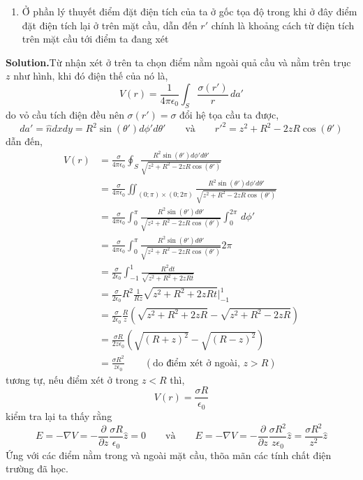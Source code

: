 \begin{enumerate}
\begin{enumerate}
\item Ở phần lý thuyết điểm đặt điện tích của ta ở gốc tọa độ trong khi ở đây điểm đặt điện tích lại ở trên mặt cầu, dẫn đến $r'$ chính là khoảng cách từ điện tích trên mặt cầu tới điểm ta đang xét
\end{enumerate} 
\textbf{Solution.}Từ nhận xét ở trên ta chọn điểm nằm ngoài quả cầu và nằm trên trục $z$ như hình, khi đó điện thế của nó là,
\[
V(r) = \frac{1}{4\pi\epsilon_{0}}\int_{S} \frac{\sigma(r')}{r} \, da'
\]
do vỏ cầu tích điện đều nên $\sigma(r') = \sigma$ đổi hệ tọa cầu ta được,
\[
da' = \hat{n}dxdy = R^2\sin(\theta')d\phi'd\theta' \qquad \text{và} \qquad r'^2 = z^2 + R^2 -2zR\cos(\theta')
\]
dẫn đến,
\begin{align*}
V(r) &= \frac{\sigma}{4\pi\epsilon_{0}}\oint_{S} \frac{R^2\sin(\theta')d\phi'd\theta'}{\sqrt{z^2 + R^2 -2zR\cos(\theta')}} \\[6pt]
&= \frac{\sigma}{4\pi\epsilon_{0}}\iint_{(0;\pi) \times (0;2\pi)} \frac{R^2\sin(\theta')d\phi'd\theta'}{\sqrt{z^2 + R^2 -2zR\cos(\theta')}} \\[6pt]
&= \frac{\sigma}{4\pi\epsilon_{0}}\int_{0}^{\pi} \frac{R^2\sin(\theta')d\theta'}{\sqrt{z^2 + R^2 -2zR\cos(\theta')}} \int_{0}^{2\pi} \, d\phi'\\[6pt]
&= \frac{\sigma}{4\pi\epsilon_{0}}\int_{0}^{\pi} \frac{R^2\sin(\theta')d\theta'}{\sqrt{z^2 + R^2 -2zR\cos(\theta')}} 2\pi\\[6pt]
&= \frac{\sigma}{2\epsilon_{0}}\int_{-1}^{1} \frac{R^2dt}{\sqrt{z^2 + R^2 +2zRt}} \\[6pt]
&= \frac{\sigma}{2\epsilon_{0}} R^2 \frac{1}{Rz} \sqrt{z^2 + R^2 +2zRt} \Big|_{-1}^1 \\[6pt]
&= \frac{\sigma}{2\epsilon_{0}} \frac{R}{z} (\sqrt{z^2 + R^2 +2zR}-\sqrt{z^2 + R^2 -2zR}) \\[6pt]
&= \frac{\sigma R}{2z\epsilon_{0}} (\sqrt{(R+z)^2}-\sqrt{(R-z)^2})\\[6pt]
&= \frac{\sigma R^2}{z\epsilon_{0}} \qquad (\text{do điểm xét ở ngoài, $z > R$})
\end{align*}
tương tự, nếu điểm xét ở trong $z < R$ thì,
\[
V(r) = \frac{\sigma R}{\epsilon_{0}}
\]
kiểm tra lại ta thấy rằng
\[
E = -\nabla V = -\frac{\partial}{\partial z} \frac{\sigma R}{\epsilon_{0}}\hat{z} = 0 
\qquad \text{và} \qquad
E = -\nabla V = -\frac{\partial}{\partial z} \frac{\sigma R^2}{z\epsilon_{0}}\hat{z} = \frac{\sigma R^2}{z^2}\hat{z}
\]
Ứng với các điểm nằm trong và ngoài mặt cầu, thõa mãn các tính chất điện trường đã học.
\end{enumerate}
